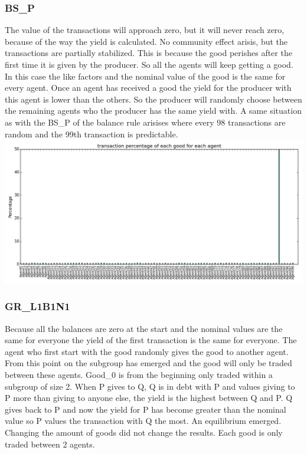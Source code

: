 \documentclass[twoside,openright]{uva-bachelor-thesis}
\begin{document}
\subsubsection{BS\_P}
The value of the transactions will approach zero, but it will never reach zero, because of the way the yield is calculated. No community effect arisis, but the transactions are partially stabilized. This is because the good perishes after the first time it is given by the producer. So all the agents will keep getting a good. In this case the like factors and the nominal value of the good is the same for every agent. Once an agent has received a good the yield for the producer with this agent is lower than the others. So the producer will randomly choose between the remaining agents who the producer has the same yield with. A same situation as with the BS\_P of the balance rule arisises where every 98 transactions are random and the 99th transaction is predictable.
\includegraphics[scale=0.4]{GR_BS_P/4000transactions}

\subsubsection{GR\_L1B1N1}
Because all the balances are zero at the start and the nominal values are the same for everyone the yield of the first transaction is the same for everyone. The agent who first start with the good randomly gives the good to another agent. From this point on the subgroup has emerged and the good will only be traded between these agents. Good\_0 is from the beginning only traded within a subgroup of size 2.  When P gives to Q, Q is in debt with P and values giving to P more than giving to anyone else, the yield is the highest between Q and P. Q gives back to P and now the yield for P has become greater than the nominal value so P values the transaction with Q the most. An equilibrium emerged. Changing the amount of goods did not change the results. Each good is only traded between 2 agents.
\end{document}
